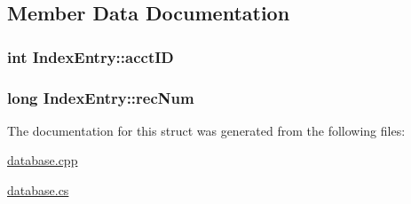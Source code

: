 \subsection{\-Member \-Data \-Documentation}
\hypertarget{struct_index_entry_aa5008695f70f365c7959d42ccca0fa13}{
\subsubsection[{acct\-I\-D}]{\setlength{\rightskip}{0pt plus 5cm}int {\bf \-Index\-Entry\-::acct\-I\-D}}}\label{struct_index_entry_aa5008695f70f365c7959d42ccca0fa13}
\hypertarget{struct_index_entry_a3f71077b699f2d718ca60df893c4c470}{
\subsubsection[{rec\-Num}]{\setlength{\rightskip}{0pt plus 5cm}long {\bf \-Index\-Entry\-::rec\-Num}}}\label{struct_index_entry_a3f71077b699f2d718ca60df893c4c470}


\-The documentation for this struct was generated from the following files\-:\begin{DoxyCompactItemize}
\item 
\hyperlink{database_8cpp}{database.\-cpp}\item 
\hyperlink{database_8cs}{database.\-cs}\end{DoxyCompactItemize}
